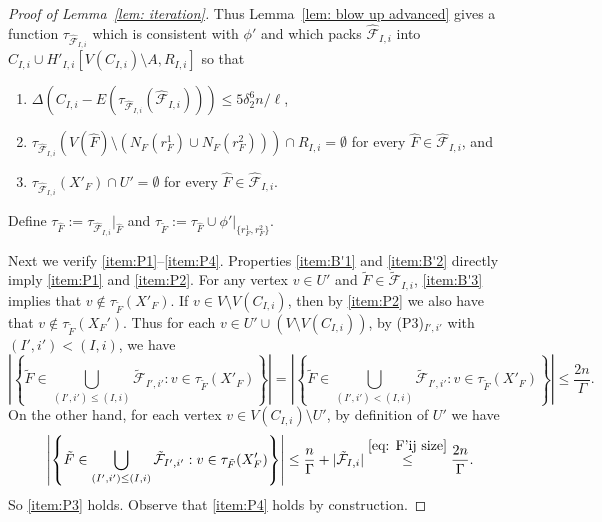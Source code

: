\documentclass[a4paper, 11pt, reqno]{amsart}
\numberwithin{equation}{section}
\newcommand{\1}{{\rm 1\hspace*{-0.4ex}%
\rule{0.1ex}{1.52ex}\hspace*{0.2ex}}}
\newcommand{\cF}{\mathcal{F}}
\newcommand{\I}{I}
\newcommand{\sm}{\setminus}
\begin{document}
\begin{proof}[Proof of Lemma~\ref{lem: iteration}]
Thus Lemma~\ref{lem: blow up advanced} gives a function $\tau_{\hat{\cF}_{{\I},i}}$ which is consistent with $\phi'$ and which packs $\hat{\cF}_{{\I},i}$ into  $C_{{\I},i}\cup H'_{{\I},i}[V(C_{{\I},i})\sm A,R_{\I,i}]$ so that
\begin{enumerate}[label=(A$'$\arabic*)]
\item\label{item:B'1} $\Delta( C_{{\I},i}-E(\tau_{\hat{\cF}_{\I,i}}(\hat{\cF}_{\I,i})) ) \leq 5\delta_2^6 n/\ell$,
\item\label{item:B'2} $\tau_{\hat{\cF}_{\I,i}}(V(\hat{F})\setminus(N_{F}(r^1_F) \cup N_{F}(r^2_F) )) \cap R_{I,i} =\emptyset$ for every $\hat{F}\in \hat{\cF}_{\I,i}$, and
\item\label{item:B'3} $\tau_{\hat{\cF}_{\I,i}}(X'_F) \cap U' =\emptyset$ for every $\hat{F}\in \hat{\cF}_{\I,i}$.
\end{enumerate}
Define 
$\tau_{\hat{F}}:=\tau_{\hat{\cF}_{\I,i}}|_{\hat{F}}$
and  $\tau_{\tilde{F}}:=\tau_{\hat{F}}\cup \phi'|_{\{r^1_F,r^2_F\}}$.


Next we verify \ref{item:P1}--\ref{item:P4}.
Properties \ref{item:B'1} and \ref{item:B'2} directly imply \ref{item:P1} and \ref{item:P2}.
For any vertex $v\in U'$ and $\tilde{F}\in \tilde{\cF}_{\I,i}$, \ref{item:B'3} implies that $v\notin \tau_{\tilde{F}}(X'_{F})$.
If $v\in V\sm V(C_{\I,i})$,
then by \ref{item:P2} we also have that $v\notin\tau_{\tilde{F}}(X_F')$.
Thus for each $v\in U'\cup (V\sm V(C_{\I,i}))$, 
by (P3)$_{I',i'}$ with $(I',i')<(I,i)$, we have 
$$\left|\left\{\tilde{F}  \in \bigcup_{({\I}',i')\leq ({\I},i)} \tilde{\cF} _{{\I}',i'}: v\in \tau_{\tilde{F} }(X'_{F})\right\}\right| 
= \left|\left\{\tilde{F}  \in \bigcup_{({\I}',i') <({\I},i)} \tilde{\cF} _{{\I}',i'}: v\in \tau_{\tilde{F} }(X'_{F})\right\}\right|
\leq \frac{2n}{\Gamma}.$$
On the other hand, for each vertex $v \in V(C_{\I,i})\sm U'$, by definition of $U'$ we have
$$\left|\left\{\tilde{F}  \in \bigcup_{({\I}',i')\leq ({\I},i)} \tilde{\cF} _{{\I}',i'}: v\in \tau_{\tilde{F} }(X'_{F})\right\}\right| 
\leq  \frac{n}{\Gamma} + |\tilde{\cF}_{{\I},i}| 
\stackrel{\eqref{eq: F'ij size}}{\leq}\frac{2n}{\Gamma}.$$
So \ref{item:P3} holds.
Observe that \ref{item:P4} holds by construction.


\end{proof}
\end{document}
